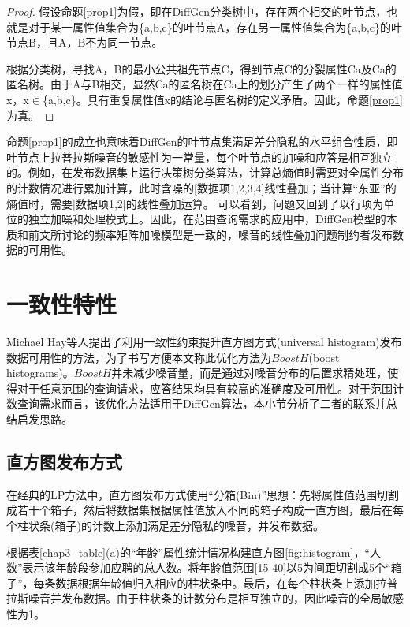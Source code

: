 \begin{proof}
  假设命题\ref{prop1}为假，即在DiffGen分类树中，存在两个相交的叶节点，也就是对于某一属性值集合为\{a,b,c\}的叶节点A，存在另一属性值集合为\{a,b,c\}的叶节点B，且A，B不为同一节点。
  	
  根据分类树，寻找A，B的最小公共祖先节点C，得到节点C的分裂属性Ca及Ca的匿名树。由于A与B相交，显然Ca的匿名树在Ca上的划分产生了两个一样的属性值x，x$\in$\{a,b,c\}。具有重复属性值x的结论与匿名树的定义矛盾。因此，命题\ref{prop1}为真。
\end{proof}

命题\ref{prop1}的成立也意味着DiffGen的叶节点集满足差分隐私的水平组合性质\cite{dpcombination}，即叶节点上拉普拉斯噪音的敏感性为一常量，每个叶节点的加噪和应答是相互独立的。例如，在发布数据集上运行决策树分类算法，计算总熵值时需要对全属性分布的计数情况进行累加计算，此时含噪的[数据项1,2,3,4]线性叠加；当计算“东亚”的熵值时，需要[数据项1,2]的线性叠加运算。
可以看到，问题又回到了以行项为单位的独立加噪和处理模式上。因此，在范围查询需求的应用中，DiffGen模型的本质和前文所讨论的频率矩阵加噪模型是一致的，噪音的线性叠加问题制约者发布数据的可用性。


\section{一致性特性}

Michael Hay等人提出了利用一致性约束提升直方图方式(universal histogram)发布数据可用性的方法\cite{boosting}，为了书写方便本文称此优化方法为$BoostH$(boost histograms)。$BoostH$并未减少噪音量，而是通过对噪音分布的后置求精处理，使得对于任意范围的查询请求，应答结果均具有较高的准确度及可用性。对于范围计数查询需求而言，该优化方法适用于DiffGen算法，本小节分析了二者的联系并总结启发思路。

\subsection{直方图发布方式}

在经典的LP\cite{Dwork Calibrating}方法中，直方图发布方式使用“分箱(Bin)”思想：先将属性值范围切割成若干个箱子，然后将数据集根据属性值放入不同的箱子构成一直方图，最后在每个柱状条(箱子)的计数上添加满足差分隐私的噪音，并发布数据。

根据表\ref{chap3_table}(a)的“年龄”属性统计情况构建直方图\ref{fig:histogram}，“人数”表示该年龄段参加应聘的总人数。将年龄值范围[15-40]以5为间距切割成5个“箱子”，每条数据根据年龄值归入相应的柱状条中。最后，在每个柱状条上添加拉普拉斯噪音并发布数据。由于柱状条的计数分布是相互独立的，因此噪音的全局敏感性为1。

